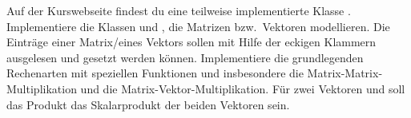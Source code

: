 \begin{aufg}
  Auf der Kurswebseite findest du eine teilweise implementierte Klasse .
  Implementiere die Klassen  und , die Matrizen bzw.\
  Vektoren modellieren.
  Die Einträge einer Matrix/eines Vektors sollen mit Hilfe der eckigen Klammern
  \lpy{[]} ausgelesen und gesetzt werden können.
  Implementiere die grundlegenden Rechenarten mit speziellen Funktionen und
  insbesondere die Matrix-Matrix-Multiplikation und die Matrix-Vektor-Multiplikation.
  Für zwei Vektoren \lpy{A} und \lpy{B} soll das Produkt \lpy{A*B} das 
  Skalarprodukt der beiden Vektoren sein.
\end{aufg}
